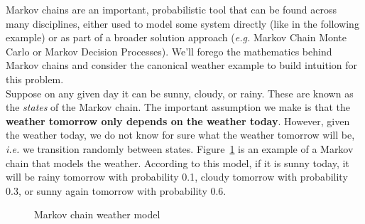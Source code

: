 \documentclass[12pt,reqno]{article}
\theoremstyle{definition}
\numberwithin{equation}{section}
\begin{document}
Markov chains are an important, probabilistic tool that can be found across many disciplines,
either used to model some system directly (like in the following example) or as part of a broader solution
approach (\textit{e.g.} Markov Chain Monte Carlo or Markov Decision Processes). We'll forego the mathematics behind Markov chains and consider the canonical weather example
to build intuition for this problem.\\
\noindent Suppose on any given day it can be sunny, cloudy, or rainy. These are known as the \textit{states}
of the Markov chain. 
The important assumption we make is that the \textbf{weather tomorrow only depends on the weather today}.
However, given the weather today, we do not know for sure what the weather tomorrow will be, \textit{i.e.} we transition
randomly between states. Figure~\ref{fig:markov} is an example of a Markov chain that models the weather. According to this model,
if it is sunny today, it will be rainy tomorrow with probability 0.1, cloudy tomorrow with probability 0.3,
or sunny again tomorrow with probability 0.6.  

\begin{figure}[htbp]
    \centering
{}
    \caption{Markov chain weather model}
    \label{fig:markov}
\end{figure}
\end{document}
